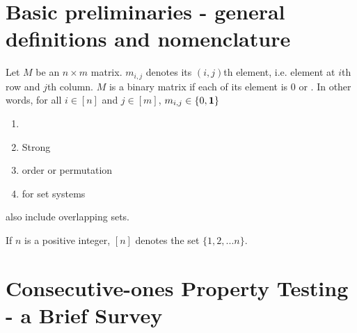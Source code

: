 \section{Basic preliminaries - general definitions and nomenclature}
\label{sec:basicprelim}

\begin{definition}
  \label{def:binmatrix}
  Let $M$ be an $n \times m$ matrix. $m_{i,j}$ denotes its $(i,j)$th
  element, i.e. element at $i$th row and $j$th column. $M$ is a binary
  matrix if each of its element is 0 or \un.
  In other words, for all $i \in [n]$ and $j \in [m]$, $m_{i,j} \in
  \{0, \textbf{1}\}$ 
\end{definition}

\begin{definition}[\emph{\Cop}]
    \label{def:copmatrix}
  \begin{enumerate}
  \item \Cop
  \item Strong \cop
  \item \Cop order or \cop permutation
  \item \Cop for set systems
  \end{enumerate}
\end{definition}

\figcopmatrix
{}

\begin{definition}[\emph{\Crop}]
  \label{def:cropmatrix}
\end{definition}

\begin{definition}
    \label{def:setsystem}

    also include overlapping sets.
\end{definition}

\begin{definition}
  \label{def:graphtree}  
\end{definition}

\begin{definition}
  \label{def:maxclique}    
\end{definition}

If $n$ is a positive integer, $[n]$ denotes the set $\{1,2,... n\}$.

\section{Consecutive-ones Property Testing - a Brief Survey}
\label{sec:background}

